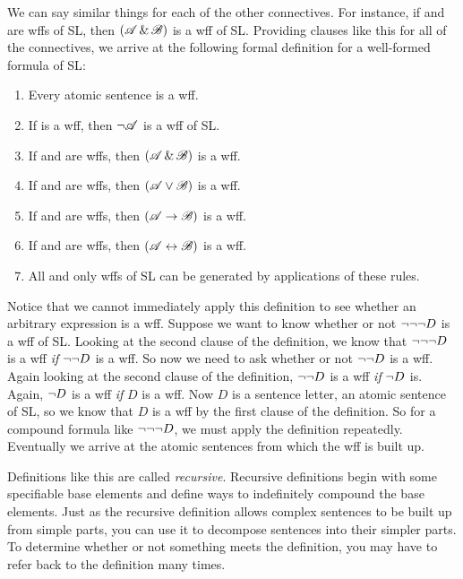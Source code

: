 
We can say similar things for each of the other connectives. For instance, if  and  are wffs of SL, then $(\mathscr{A}\,\&\,\mathscr{B})$ is a wff of SL. Providing clauses like this for all of the connectives, we arrive at the following formal definition for a {well-formed formula of SL}:

\begin{enumerate}
\item Every atomic sentence is a wff.
\item If  is a wff, then $\neg\mathscr{A}$ is a wff of SL.
\item If  and  are wffs, then $(\mathscr{A}\,\&\,\mathscr{B})$ is a wff.
\item If  and  are wffs, then $(\mathscr{A}\vee\mathscr{B})$ is a wff.
\item If  and  are wffs, then $(\mathscr{A}\rightarrow\mathscr{B})$ is a wff.
\item If  and  are wffs, then $(\mathscr{A}\leftrightarrow\mathscr{B})$ is a wff.
\item All and only wffs of SL can be generated by applications of these rules.
\end{enumerate}


Notice that we cannot immediately apply this definition to see whether an arbitrary expression is a wff. Suppose we want to know whether or not $\neg \neg \neg D$ is a wff of SL. Looking at the second clause of the definition, we know that $\neg \neg \neg D$ is a wff \emph{if} $\neg \neg D$ is a wff. So now we need to ask whether or not $\neg \neg D$ is a wff. Again looking at the second clause of the definition, $\neg \neg D$ is a wff \emph{if} $\neg D$ is. Again, $\neg D$ is a wff \emph{if} $D$ is a wff. Now $D$ is a sentence letter, an atomic sentence of SL, so we know that $D$ is a wff by the first clause of the definition. So for a compound formula like $\neg \neg \neg D$, we must apply the definition repeatedly. Eventually we arrive at the atomic sentences from which the wff is built up.

Definitions like this are called \emph{recursive}. Recursive definitions begin with some specifiable base elements and define ways to indefinitely compound the base elements. Just as the recursive definition allows complex sentences to be built up from simple parts, you can use it to decompose sentences into their simpler parts. To determine whether or not something meets the definition, you may have to refer back to the definition many times.

